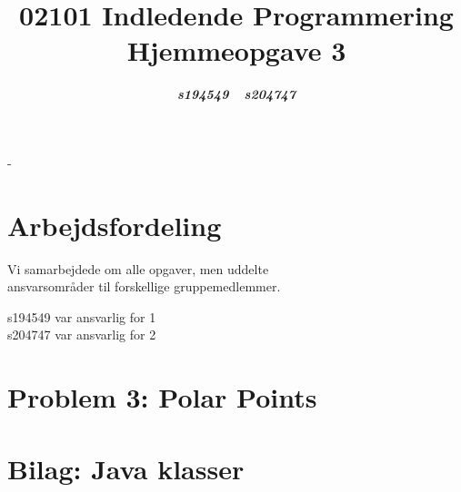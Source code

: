 \documentclass[a4paper]{article}
\begin{document}
\title{\Huge\textbf{
  02101 Indledende Programmering \\ Hjemmeopgave 3
}}

\author{\selectfont\textsl{
  \textbf{s194549} 
  ~
  \textbf{s204747}
}}

\date{\selectfont{
  29. oktober, \quad 2021
}}

\maketitle

\selectfont
\color{white}-
\\[2pt]
\color{black}
\section*{Arbejdsfordeling}
Vi samarbejdede om alle opgaver, men uddelte \\ ansvarsområder til forskellige gruppemedlemmer.

s194549 var ansvarlig for 1\\
s204747 var ansvarlig for 2

\pagebreak

\section{Problem 3: Polar Points}

\pagebreak
\section{Bilag: Java klasser}
\label{appendix}
\end{document}

